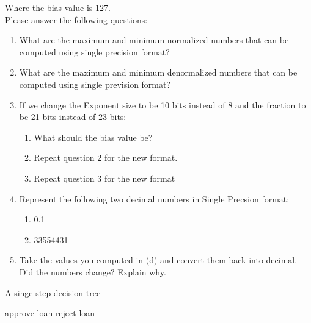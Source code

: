 \documentclass[main.tex]{subfiles}
\begin{document}
\begin{enumerate}
Where the bias value is 127.\\

Please answer the following questions:

\begin{enumerate}
    \item What are the maximum and minimum normalized numbers that can be computed using single precision format?
    \item What are the maximum and minimum denormalized numbers that can be computed using single prevision format?
    \item If we change the Exponent size to be 10 bits instead of 8 and the fraction to be 21 bits instead of 23 bits:
    \begin{enumerate}
        \item What should the bias value be?
        \item Repeat question 2 for the new format.
        \item Repeat question 3 for the new format
    \end{enumerate}
    \item Represent the following two decimal numbers in Single Precsion format:
    \begin{enumerate}
        \item 0.1
        \item 33554431
    \end{enumerate}
    \item Take the values you computed in (d) and convert them back into decimal. Did the numbers change? Explain why.
\end{enumerate}

























\begin{algorithm}
\caption{A singe step decision tree}
\begin{algorithmic}[1]
    \State approve loan
\Else
    \State reject loan
\end{algorithmic}
\end{algorithm}


\end{enumerate}
\end{document}
